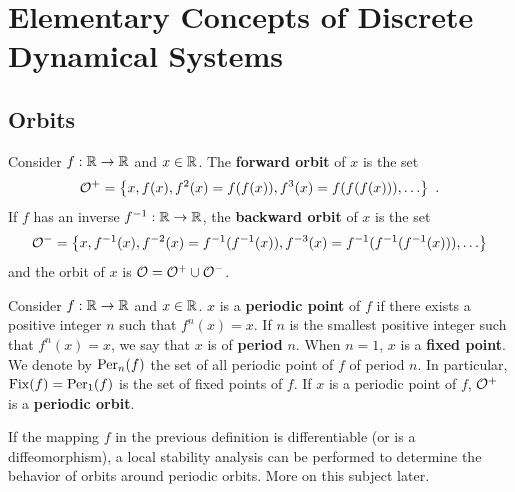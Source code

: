 \chapter[Elementary Concepts]{Elementary Concepts of Discrete
Dynamical Systems}

\section{Orbits}


\begin{defn} 
Consider $f:\mathbb{R} \rightarrow \mathbb{R}$ and $x \in \mathbb{R}$.  The
{\bfseries forward orbit} of $x$ is the set
\[
\mathcal{O}^+ = \left\{ x, f(x), f^2(x) = f(f(x)), f^3(x)= f(f(f(x))), \ldots
\right\} \ .
\]
If $f$ has an inverse $f^{-1}:\mathbb{R}\rightarrow \mathbb{R}$, the
{\bfseries backward orbit} of $x$ is the set
\[
\mathcal{O}^- = \left\{ x, f^{-1}(x), f^{-2}(x) = f^{-1}(f^{-1}(x)),
f^{-3}(x)= f^{-1}(f^{-1}(f^{-1}(x))), \ldots \right\}
\]
and the orbit of $x$ is $\mathcal{O} = \mathcal{O}^+ \cup \mathcal{O}^-$.
\end{defn}

\begin{defn}
Consider $f:\mathbb{R} \rightarrow \mathbb{R}$ and $x \in \mathbb{R}$.  $x$ is a
{\bfseries periodic point} of $f$ if there
exists a positive integer
$n$ such that $f^n(x) = x$.  If $n$ is the smallest positive integer
such that $f^n(x)=x$, we say that $x$ is of {\bfseries period} $n$.
When $n=1$, $x$ is a {\bfseries fixed point}.  We denote by
$\operatorname{Per}_n(f)$ the set of all periodic point of $f$ of period $n$.  In
particular, $\operatorname{Fix}(f) = \operatorname{Per}_1(f)$ is the set of fixed points of $f$.
If $x$ is a periodic point of $f$, $\mathcal{O}^+$ is a
{\bfseries periodic orbit}.
\end{defn}

If the mapping $f$ in the previous definition is differentiable (or is
a diffeomorphism), a local stability analysis can be performed to
determine the behavior of orbits around periodic orbits.  More on this
subject later.

